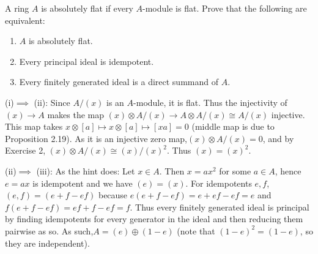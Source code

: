 \documentclass[a4paper]{exam}
\newif\ifhint
\begin{document}
\begin{questions}
	\question A ring $A$ is absolutely flat if every $A$-module is flat. Prove that the following are equivalent:
	\begin{enumerate}
		\item $A$ is absolutely flat.
		\item Every principal ideal is idempotent.
		\item Every finitely generated ideal is a direct summand of $A$.
	\end{enumerate}
	\ifhint
		Let $x\in A$. Then $A / (x)$ is a flat $A$-module, hence in the diagram
		\[
		\begin{tikzcd}
			(x) \otimes A & (x) \otimes A / (x)\ \
				A & A / (x)
		\arrow[from=1-1,to=1-2]
		\arrow["\beta",from=1-1,to=2-1]
		\arrow["\alpha",from=2-1,to=2-2]
		\arrow[from=1-2,to=2-2]
		\end{tikzcd}
		\]
		the mapping $\alpha$ is injective. Hence $\Im(\beta ) = 0 $, hence $(x) = (x)^2$. (ii) $\implies$ (iii): Let $x\in A$. Then $x = ax^2$ for some $a\in A $, hence $e = ax$ is idempotent and we have $(e) = (x)$. Now if $e,f$ are idempotents, then $(e,f) = (e+f-ef)$. Hence every finitely generated ideal is principal, and generated by an idempotent $e $, hence is a direct summand because $A = (e) \oplus (e-e)$. (iii) $\implies$ (i): Use the criterion of Exercise 26.
	\fi
	\begin{solution}
		(i)$\implies$ (ii): Since $A / (x)$ is an $A$-module, it is flat.
		Thus the injectivity of $(x) \to A$ makes the map $(x) \otimes A / (x) \to A \otimes A / (x) \cong A / (x)$ injective.
		This map takes $x \otimes [a] \mapsto x \otimes [a] \mapsto [xa] = 0$ (middle map is due to Proposition 2.19).
		As it is an injective zero map,$(x) \otimes A / (x) = 0$, and by Exercise 2, $(x) \otimes A / (x) \cong (x) / (x)^2$.
		Thus $(x) = (x)^2$.

		(ii)$\implies$ (iii):
		As the hint does:
		Let $x\in A$.
		Then $x = ax^2$ for some $a\in A $, hence $e = ax$ is idempotent and we have $(e) = (x)$.
		For idempotents $e,f $, $(e,f) = (e+f -ef)$ because $e(e+f-ef) = e + ef - ef = e$ and $f(e+f-ef) = ef + f - ef = f$.
		Thus every finitely generated ideal is principal by finding idempotents for every generator in the ideal and then reducing them pairwise as so.
		As such,$A = (e) \oplus (1-e)$ (note that $(1-e)^2 = (1-e) $, so they are independent).


\end{solution}
\end{questions}
\end{document}
